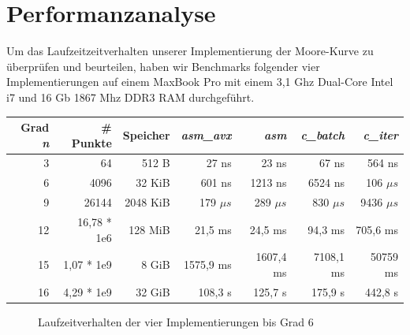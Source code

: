 \documentclass[course=erap]{aspdoc}
\begin{document}
\section{Performanzanalyse}
Um das Laufzeitzeitverhalten unserer Implementierung der Moore-Kurve zu überprüfen und beurteilen, haben wir Benchmarks folgender vier Implementierungen auf einem MaxBook Pro mit einem 3,1 Ghz Dual-Core Intel i7 und 16 Gb 1867 Mhz DDR3 RAM durchgeführt.

\begin{center}
    \begin{tabular}{| r | r | r | r | r | r | r |}
    \hline
    Grad \textit{n} & \# Punkte & Speicher & \textit{asm\_avx} & \textit{asm} & \textit{c\_batch} & \textit{c\_iter}  \\ \hline
    3 & 64 & 512 B  & 27 ns & 23 ns & 67 ns & 564 ns \\  \hline
    6 & 4096 & 32 KiB  & 601 ns & 1213 ns & 6524 ns & 106 $\mu s$ \\  \hline
    9 & 26144 & 2048 KiB  & 179 $\mu s$ & 289 $\mu s$ & 830 $\mu s$ & 9436 $\mu s$  \\  \hline
    12 & 16,78 * 1e6 & 128 MiB & 21,5 ms & 24,5 ms & 94,3 ms & 705,6 ms \\ \hline
    15 & 1,07 * 1e9 & 8 GiB & 1575,9 ms & 1607,4 ms & 7108,1 ms & 50759 ms \\ \hline
    16 & 4,29 * 1e9 & 32 GiB & 108,3 s & 125,7 s & 175,9 s & 442,8 s \\ \hline
    \end{tabular}
\end{center}

\begin{figure}[htbp] 
    \centering
    \qquad
    \caption{Laufzeitverhalten der vier Implementierungen bis Grad 6}%
    \label{fig:Laufzeitvergleich}%
 \end{figure}
 
\end{document}
